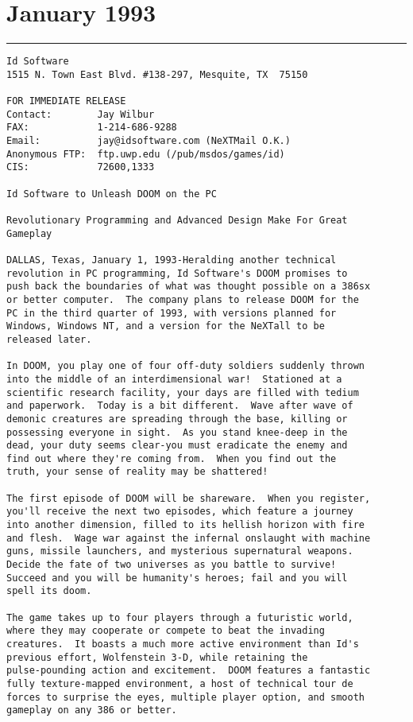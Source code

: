 \section{January 1993}
\label{label_pressrelease}
\hrule \par \bigskip
{}
\begin{verbatim}
Id Software
1515 N. Town East Blvd. #138-297, Mesquite, TX  75150

FOR IMMEDIATE RELEASE
Contact:        Jay Wilbur
FAX:            1-214-686-9288
Email:          jay@idsoftware.com (NeXTMail O.K.)
Anonymous FTP:  ftp.uwp.edu (/pub/msdos/games/id)
CIS:            72600,1333

Id Software to Unleash DOOM on the PC

Revolutionary Programming and Advanced Design Make For Great
Gameplay

DALLAS, Texas, January 1, 1993-Heralding another technical
revolution in PC programming, Id Software's DOOM promises to
push back the boundaries of what was thought possible on a 386sx
or better computer.  The company plans to release DOOM for the
PC in the third quarter of 1993, with versions planned for 
Windows, Windows NT, and a version for the NeXTall to be
released later.

In DOOM, you play one of four off-duty soldiers suddenly thrown
into the middle of an interdimensional war!  Stationed at a
scientific research facility, your days are filled with tedium
and paperwork.  Today is a bit different.  Wave after wave of
demonic creatures are spreading through the base, killing or
possessing everyone in sight.  As you stand knee-deep in the
dead, your duty seems clear-you must eradicate the enemy and
find out where they're coming from.  When you find out the
truth, your sense of reality may be shattered!

The first episode of DOOM will be shareware.  When you register,
you'll receive the next two episodes, which feature a journey
into another dimension, filled to its hellish horizon with fire
and flesh.  Wage war against the infernal onslaught with machine
guns, missile launchers, and mysterious supernatural weapons. 
Decide the fate of two universes as you battle to survive! 
Succeed and you will be humanity's heroes; fail and you will
spell its doom.

The game takes up to four players through a futuristic world,
where they may cooperate or compete to beat the invading
creatures.  It boasts a much more active environment than Id's
previous effort, Wolfenstein 3-D, while retaining the
pulse-pounding action and excitement.  DOOM features a fantastic
fully texture-mapped environment, a host of technical tour de
forces to surprise the eyes, multiple player option, and smooth
gameplay on any 386 or better.


\end{verbatim}
